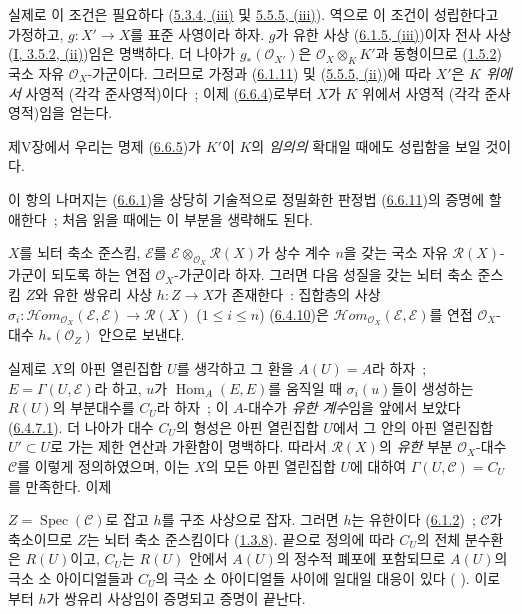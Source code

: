실제로 이 조건은 필요하다
(\hyperref[II.5.3.4-ko]{5.3.4, (iii)} 및
\hyperref[II.5.5.5-ko]{5.5.5, (iii)}). 역으로 이 조건이 성립한다고
가정하고, $g:X'\to X$를 표준 사영이라 하자. $g$가 유한 사상
(\hyperref[II.6.1.5-ko]{6.1.5, (iii)})이자 전사 사상
(\hyperref[I.3.5.2-ko]{I, 3.5.2, (ii)})임은 명백하다. 더 나아가
$g_*(\mathcal{O}_{X'})$은 $\mathcal{O}_X\otimes_K K'$과 동형이므로
(\hyperref[II.1.5.2-ko]{1.5.2}) 국소 자유 $\mathcal{O}_X$-가군이다.
그러므로 가정과 (\hyperref[II.6.1.11-ko]{6.1.11}) 및
(\hyperref[II.5.5.5-ko]{5.5.5, (ii)})에 따라 $X'$은
\emph{$K$ 위에서} 사영적 (각각 준사영적)이다~; 이제
(\hyperref[II.6.6.4-ko]{6.6.4})로부터 $X$가 $K$ 위에서 사영적
(각각 준사영적)임을 얻는다.

제V장에서 우리는 명제 (\hyperref[II.6.6.5-ko]{6.6.5})가 $K'$이
$K$의 \emph{임의의} 확대일 때에도 성립함을 보일 것이다.

이 항의 나머지는 (\hyperref[II.6.6.1-ko]{6.6.1})을 상당히 기술적으로
정밀화한 판정법 (\hyperref[II.6.6.11-ko]{6.6.11})의 증명에 할애한다~;
처음 읽을 때에는 이 부분을 생략해도 된다.

\begin{lemma}[6.6.6]
\label{II.6.6.6-ko}
$X$를 뇌터 축소 준스킴, $\mathcal{E}$를
$\mathcal{E}\otimes_{\mathcal{O}_X}\mathcal{R}(X)$가 상수 계수 $n$을
갖는 국소 자유 $\mathcal{R}(X)$-가군이 되도록 하는 연접
$\mathcal{O}_X$-가군이라 하자. 그러면 다음 성질을 갖는 뇌터 축소 준스킴
$Z$와 유한 쌍유리 사상 $h:Z\to X$가 존재한다~: 집합층의 사상
$\sigma_i:\mathcal{H}om_{\mathcal{O}_X}(\mathcal{E},\mathcal{E})
\to\mathcal{R}(X)$ ($1\leq i\leq n$)
(\hyperref[II.6.4.10-ko]{6.4.10})은
$\mathcal{H}om_{\mathcal{O}_X}(\mathcal{E},\mathcal{E})$를 연접
$\mathcal{O}_X$-대수 $h_*(\mathcal{O}_Z)$ 안으로 보낸다.
\end{lemma}

실제로 $X$의 아핀 열린집합 $U$를 생각하고 그 환을 $A(U)=A$라 하자~;
$E=\Gamma(U,\mathcal{E})$라 하고, $u$가
$\operatorname{Hom}_A(E,E)$를 움직일 때 $\sigma_i(u)$들이 생성하는
$R(U)$의 부분대수를 $C_U$라 하자~; 이 $A$-대수가 \emph{유한 계수}임을
앞에서 보았다 (\hyperref[II.6.4.7.1-ko]{6.4.7.1}). 더 나아가 대수
$C_U$의 형성은 아핀 열린집합 $U$에서 그 안의 아핀 열린집합
$U'\subset U$로 가는 제한 연산과 가환함이 명백하다. 따라서
$\mathcal{R}(X)$의 \emph{유한} 부분 $\mathcal{O}_X$-대수
$\mathcal{C}$를 이렇게 정의하였으며, 이는 $X$의 모든 아핀 열린집합
$U$에 대하여 $\Gamma(U,\mathcal{C})=C_U$를 만족한다. 이제


$Z=\operatorname{Spec}(\mathcal{C})$로 잡고 $h$를 구조 사상으로 잡자.
그러면 $h$는 유한이다 (\hyperref[II.6.1.2-ko]{6.1.2})~;
$\mathcal{C}$가 축소이므로 $Z$는 뇌터 축소 준스킴이다
(\hyperref[II.1.3.8-ko]{1.3.8}). 끝으로 정의에 따라 $C_U$의 전체
분수환은 $R(U)$이고, $C_U$는 $R(U)$ 안에서 $A(U)$의 정수적 폐포에
포함되므로 $A(U)$의 극소 소 아이디얼들과 $C_U$의 극소 소 아이디얼들
사이에 일대일 대응이 있다 (
\cite[t.~I, p.~259]{I-13}). 이로부터 $h$가 쌍유리 사상임이 증명되고
증명이 끝난다.

